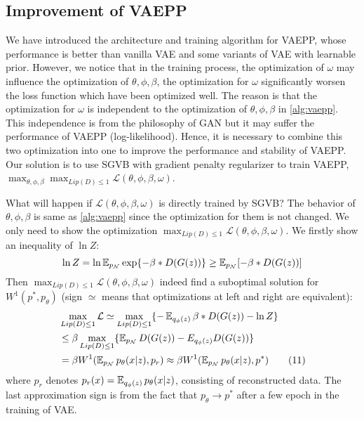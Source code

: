 \subsection{Improvement of VAEPP} \label{subsec:improve_of_vaepp}
We have introduced the architecture and training algorithm for VAEPP, whose performance is better than vanilla VAE and some variants of VAE with learnable prior. However, we notice that in the training process, the optimization of $\omega$ may influence the optimization of $\theta, \phi, \beta$, \EG the optimization for $\omega$ significantly worsen the loss function which have been optimized well. The reason is that the optimization for $\omega$ is independent to the optimization of $\theta, \phi, \beta$ in \cref{alg:vaepp}. This independence is from the philosophy of GAN but it may suffer the performance of VAEPP (log-likelihood). Hence, it is necessary to combine this two optimization into one to improve the performance and stability of VAEPP. Our solution is to use SGVB with gradient penalty regularizer to train VAEPP, \IE $\max_{\theta, \phi, \beta} \max_{Lip(D) \leq 1} \mathcal{L}(\theta, \phi, \beta, \omega)$. 

What will happen if $\mathcal{L}(\theta, \phi, \beta, \omega)$ is directly trained by SGVB? The behavior of $\theta, \phi, \beta$ is same as \cref{alg:vaepp} since the optimization for them is not changed. We only need to show the optimization $\max_{Lip(D) \leq 1} \mathcal{L}(\theta, \phi, \beta, \omega)$. We firstly show an inequality of $\ln Z$:
\begin{equation*}
	\ln Z = \ln \operatorname{\mathbb{E}}_{p_\mathcal{N}} \exp \{- \beta * D(G(z))\} \geq \operatorname{\mathbb{E}}_{p_\mathcal{N}} [- \beta * D(G(z))]
\end{equation*}
Then $\max_{Lip(D) \leq 1} \mathcal{L}(\theta, \phi, \beta, \omega)$ indeed find a suboptimal solution for $W^1(p^*, p_\theta)$ (sign $\simeq$ means that optimizations at left and right are equivalent):
\begin{align*}\label{eq:improve_vaepp}
	&\max_{Lip(D) \leq 1} \mathcal{L} \simeq \max_{Lip(D) \leq 1} \{ -\operatorname{\mathbb{E}}_{q_\phi(z)} \beta*D(G(z)) - \ln Z \}\\ 
	&\leq \beta \max_{Lip(D) \leq 1} \{ \operatorname{\mathbb{E}}_{p_\mathcal{N}} D(G(z)) - E_{q_\phi(z)} D(G(z)) \} \\
	&= \beta W^1(\operatorname{\mathbb{E}}_{p_\mathcal{N}}p_\theta(x|z), p_r) \approx \beta W^1(\operatorname{\mathbb{E}}_{p_\mathcal{N}}p_\theta(x|z), p^*) \tag{11}
\end{align*}
where $p_r$ denotes $p_r(x) = \operatorname{\mathbb{E}}_{q_\phi(z)} p_\theta(x|z)$, consisting of reconstructed data. The last approximation sign is from the fact that $p_\theta \rightarrow p^*$ after a few epoch in the training of VAE. 

